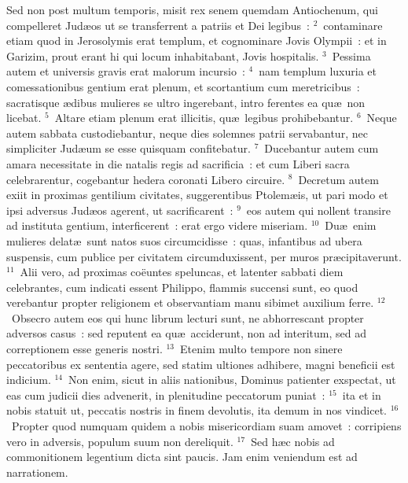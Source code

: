 \lettrine[lines=3,image=true,loversize=0.05,lraise=-0.03]{S}{}ed non post multum temporis, misit rex senem quemdam Antiochenum, qui compelleret Jud\ae os ut se transferrent a patriis et Dei legibus~:
${}^{2}$~contaminare etiam quod in Jerosolymis erat templum, et cognominare Jovis Olympii~: et in Garizim, prout erant hi qui locum inhabitabant, Jovis hospitalis.
${}^{3}$~Pessima autem et universis gravis erat malorum incursio~:
${}^{4}$~nam templum luxuria et comessationibus gentium erat plenum, et scortantium cum meretricibus~: sacratisque \ae dibus mulieres se ultro ingerebant, intro ferentes ea qu\ae\ non licebat.
${}^{5}$~Altare etiam plenum erat illicitis, qu\ae\ legibus prohibebantur.
${}^{6}$~Neque autem sabbata custodiebantur, neque dies solemnes patrii servabantur, nec simpliciter Jud\ae um se esse quisquam confitebatur.
${}^{7}$~Ducebantur autem cum amara necessitate in die natalis regis ad sacrificia~: et cum Liberi sacra celebrarentur, cogebantur hedera coronati Libero circuire.
${}^{8}$~Decretum autem exiit in proximas gentilium civitates, suggerentibus Ptolem\ae is, ut pari modo et ipsi adversus Jud\ae os agerent, ut sacrificarent~:
${}^{9}$~eos autem qui nollent transire ad instituta gentium, interficerent~: erat ergo videre miseriam.
${}^{10}$~Du\ae\ enim mulieres delat\ae\ sunt natos suos circumcidisse~: quas, infantibus ad ubera suspensis, cum publice per civitatem circumduxissent, per muros pr\ae cipitaverunt.
${}^{11}$~Alii vero, ad proximas co\"euntes speluncas, et latenter sabbati diem celebrantes, cum indicati essent Philippo, flammis succensi sunt, eo quod verebantur propter religionem et observantiam manu sibimet auxilium ferre.
${}^{12}$~Obsecro autem eos qui hunc librum lecturi sunt, ne abhorrescant propter adversos casus~: sed reputent ea qu\ae\ acciderunt, non ad interitum, sed ad correptionem esse generis nostri.
${}^{13}$~Etenim multo tempore non sinere peccatoribus ex sententia agere, sed statim ultiones adhibere, magni beneficii est indicium.
${}^{14}$~Non enim, sicut in aliis nationibus, Dominus patienter exspectat, ut eas cum judicii dies advenerit, in plenitudine peccatorum puniat~:
${}^{15}$~ita et in nobis statuit ut, peccatis nostris in finem devolutis, ita demum in nos vindicet.
${}^{16}$~Propter quod numquam quidem a nobis misericordiam suam amovet~: corripiens vero in adversis, populum suum non dereliquit.
${}^{17}$~Sed h\ae c nobis ad commonitionem legentium dicta sint paucis. Jam enim veniendum est ad narrationem.


